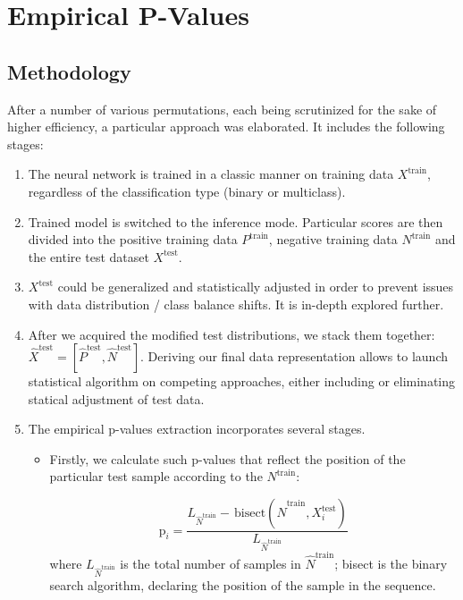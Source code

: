 \documentclass{article}
\begin{document}
\section{Empirical P-Values}

\subsection{Methodology}
After a number of various permutations, each being scrutinized for the sake of higher efficiency, a particular approach was elaborated. It includes the following stages:


\begin{enumerate}%
    \item The neural network is trained in a classic manner on training data $X^{\text{train}}$, regardless of the classification type (binary or multiclass).
    \item Trained model is switched to the inference mode. Particular scores are then divided into the positive training data $P^{\text{train}}$, negative training data $N^{\text{train}}$ and the entire test dataset $X^{\text{test}}$.
    
    \item $X^{\text{test}}$ could be generalized and statistically adjusted in order to prevent issues with data distribution / class balance shifts. It is in-depth explored further.

    \item  After we acquired the modified test distributions, we stack them together: $\hat{X}^{\text{test}} = [\hat{P}^{\text{test}}, \hat{N}^{\text{test}}]$. Deriving our final data representation allows to launch statistical algorithm on competing approaches, either including or eliminating statical adjustment of test data.

    \item The empirical p-values extraction incorporates several stages. \begin{itemize}
        \item  Firstly, we calculate such p-values that reflect the position of the particular test sample according to the $N^{\text{train}}$:

    \begin{equation}
        \text{p}_i = \frac{L_{\hat{N}^{\text{train}}} - \frac{}{} \text{bisect}(\hat{N}^{\text{train}}, X^{\text{test}}_i)}{L_{\hat{N}^{\text{train}}}}
    \end{equation}
    where $L_{\hat{N}^{\text{train}}}$ is the total number of samples in $\hat{N}^{\text{train}}$; bisect is the binary search algorithm, declaring the position of the sample in the sequence. 


\end{itemize}
\end{enumerate}
\end{document}
